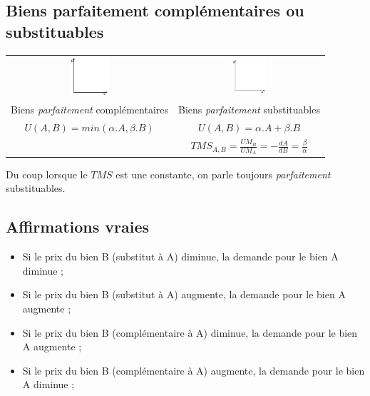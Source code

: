 \subsection{Biens parfaitement complémentaires ou substituables}
\begin{center}
	\begin{tabular}{cc}
		\includegraphics[width=0.25\textwidth]{images/graph_biens_parfaitement_complementaires.pdf}&
		\includegraphics[width=0.25\textwidth]{images/graph_biens_parfaitement_substituables.pdf}\\
		
		Biens \textit{parfaitement} complémentaires &
		Biens \textit{parfaitement} substituables\\
		
		$U(A,B)=min(\alpha .A,\beta .B)$ &
		$U(A,B)=\alpha .A + \beta .B$\\
		
		&
		$TMS_{A,B}=\frac{UM_B}{UM_A}=-\frac{dA}{dB}=\frac{\beta}{\alpha}$
	\end{tabular}\newline
\end{center}
Du coup lorsque le $TMS$ est une constante, on parle toujours \textit{parfaitement} substituables.



\subsection{Affirmations vraies}
\begin{itemize}
	\item Si le prix du bien B (substitut à A) diminue, la demande pour le bien A diminue ;
	\item Si le prix du bien B (substitut à A) augmente, la demande pour le bien A augmente ;
	\item Si le prix du bien B (complémentaire à A) diminue, la demande pour le bien A augmente ;
	\item Si le prix du bien B (complémentaire à A) augmente, la demande pour le bien A diminue ;
\end{itemize}